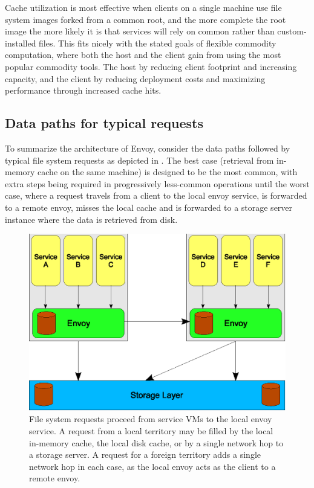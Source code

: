 Cache utilization is most effective when clients on a single machine use file system images forked from a common root, and the more complete the root image the more likely it is that services will rely on common rather than custom-installed files. This fits nicely with the stated goals of flexible commodity computation, where both the host and the client gain from using the most popular commodity tools. The host by reducing client footprint and increasing capacity, and the client by reducing deployment costs and maximizing performance through increased cache hits.

\subsection{Data paths for typical requests}

To summarize the architecture of Envoy, consider the data paths followed by typical file system requests as depicted in . The best case (retrieval from in-memory cache on the same machine) is designed to be the most common, with extra steps being required in progressively less-common operations until the worst case, where a request travels from a client to the local envoy service, is forwarded to a remote envoy, misses the local cache and is forwarded to a storage server instance where the data is retrieved from disk.

\begin{figure}[tp]
\centering
\includegraphics[width=\figwidth]{figures/hops}
\caption[Network paths taken by typical file requests]{File system requests proceed from service VMs to the local envoy service. A request from a local territory may be filled by the local in-memory cache, the local disk cache, or by a single network hop to a storage server. A request for a foreign territory adds a single network hop in each case, as the local envoy acts as the client to a remote envoy.}
\label{fig:hops}
\end{figure}

